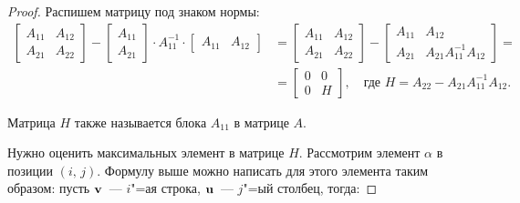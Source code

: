 \begin{theorem}
    \begin{proof}
        Распишем матрицу под знаком нормы:
        \begin{align*}
            \left[
                \begin{array}{cc}
                    A_{11} & A_{12} \\
                    A_{21} & A_{22}
                \end{array}
                \right]-\left[
                \begin{array}{c}
                    A_{11} \\
                    A_{21}
                \end{array}
                \right]\cdot A_{11}^{-1}\cdot \left[
                \begin{array}{cc}
                    A_{11} & A_{12}
                \end{array}
            \right] & =\left[
                \begin{array}{cc}
                    A_{11} & A_{12} \\
                    A_{21} & A_{22}
                \end{array}
                \right]-\left[
                \begin{array}{cc}
                    A_{11} & A_{12}                  \\
                    A_{21} & A_{21}A_{11}^{-1}A_{12}
                \end{array}
                \right]=      \\
                    & =\left[
                \begin{array}{cc}
                    0 & 0 \\
                    0 & H
                \end{array}
                \right], \quad \text{где }H = A_{22}-A_{21}A_{11}^{-1}A_{12}.
        \end{align*}

        \begin{remark}
            Матрица $H$ также называется  блока $A_{11}$ в матрице $A$.
        \end{remark}

        Нужно оценить максимальных элемент в матрице $H$. Рассмотрим элемент $\alpha$ в позиции $(i,\,j)$.
        Формулу выше можно написать для этого элемента таким образом: пусть $\mathbf{v}$~--- $i$"=ая строка,
        $\mathbf{u}$~--- $j$"=ый столбец, тогда:


\end{proof}
\end{theorem}
